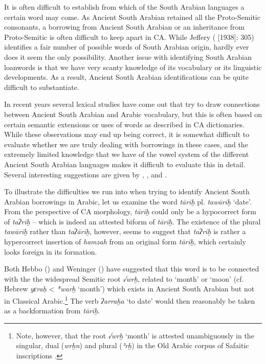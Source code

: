 \documentclass[output=paper]{langsci/langscibook}
\begin{document}
It is often difficult to establish from which of the South Arabian languages a certain word may come. As Ancient South Arabian retained all the Proto-Semitic consonants, a borrowing from Ancient South Arabian or an inheritance from Proto-Semitic is often difficult to keep apart in CA. While Jeffery (\citeyear{Jeffrey2007} [1938]: 305) identifies a fair number of possible words of South Arabian origin, hardly ever does it seem the only possibility. Another issue with identifying South Arabian loanwords is that we have very scanty knowledge of its vocabulary or its linguistic developments. As a result, Ancient South Arabian identifications can be quite difficult to substantiate.

In recent years several lexical studies have come out that try to draw connections between Ancient South Arabian and Arabic vocabulary, but this is often based on certain semantic extensions or uses of words as described in CA dictionaries. While these observations may end up being correct, it is somewhat difficult to evaluate whether we are truly dealing with borrowings in these cases, and the extremely limited knowledge that we have of the vowel system of the different Ancient South Arabian languages makes it difficult to evaluate this in detail. Several interesting suggestions are given by  \cite{Weninger2009},  \cite{Hayajneh2011},  \cite{Elmaz2014} and  \cite{Elmaz2016}. 

To illustrate the difficulties we run into when trying to identify Ancient South Arabian borrowings in Arabic, let us examine the word \textit{tārīḫ} pl. \textit{tawārīḫ} ‘date’. From the perspective of CA morphology, \textit{tārīḫ} could only be a hypocorrect form of \textit{taʔrīḫ} – which is indeed an attested biform of \textit{tārīḫ}. The existence of the plural \textit{tawārīḫ} rather than \textit{taʔārīḫ}, however, seems to suggest that \textit{taʔrīḫ} is rather a hypercorrect insertion of \textit{hamzah} from an original form \textit{tārīḫ}, which certainly looks foreign in its formation.

Both Hebbo (\citeyear[27]{Hebbo1984}) and Weninger (\citeyear[399]{Weninger2009}) have suggested that this word is to be connected with the the widespread Semitic root \textit{√wrḫ}, related to ‘month’ or ‘moon’ (cf. Hebrew \textit{yɛraḥ} < \textit{*warḫ} ‘month’) which exists in Ancient South Arabian but not in Classical Arabic.\footnote{Note, however, that the root \textit{√wrḫ} ‘month’ is attested unambiguously in the singular, dual (\textit{wrḫn}) and plural (\textit{ʾrḫ}) in the Old Arabic corpus of Safaitic inscriptions \citep[353]{Al-Jallad2015Safaitic}.} The verb \textit{ʔarraḫa} ‘to date’ would then reasonably be taken as a backformation from \textit{tārīḫ}.
\end{document}
